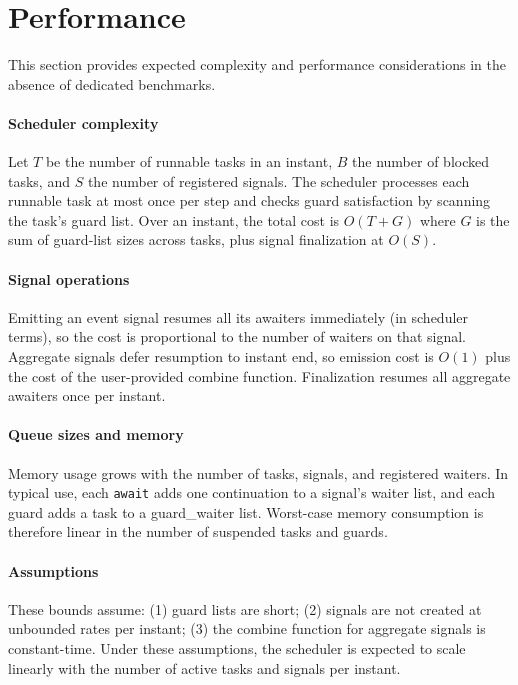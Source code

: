 \section{Performance}
This section provides expected complexity and performance considerations in the
absence of dedicated benchmarks.

\paragraph{Scheduler complexity}
Let $T$ be the number of runnable tasks in an instant, $B$ the number of
blocked tasks, and $S$ the number of registered signals. The scheduler processes
each runnable task at most once per step and checks guard satisfaction by
scanning the task's guard list. Over an instant, the total cost is
$O(T + G)$ where $G$ is the sum of guard-list sizes across tasks, plus
signal finalization at $O(S)$.

\paragraph{Signal operations}
Emitting an event signal resumes all its awaiters immediately (in scheduler
terms), so the cost is proportional to the number of waiters on that signal.
Aggregate signals defer resumption to instant end, so emission cost is $O(1)$
plus the cost of the user-provided combine function. Finalization resumes all
aggregate awaiters once per instant.

\paragraph{Queue sizes and memory}
Memory usage grows with the number of tasks, signals, and registered waiters.
In typical use, each \texttt{await} adds one continuation to a signal's waiter
list, and each guard adds a task to a guard\_waiter list. Worst-case memory
consumption is therefore linear in the number of suspended tasks and guards.

\paragraph{Assumptions}
These bounds assume: (1) guard lists are short; (2) signals are not created at
unbounded rates per instant; (3) the combine function for aggregate signals is
constant-time. Under these assumptions, the scheduler is expected to scale
linearly with the number of active tasks and signals per instant.

